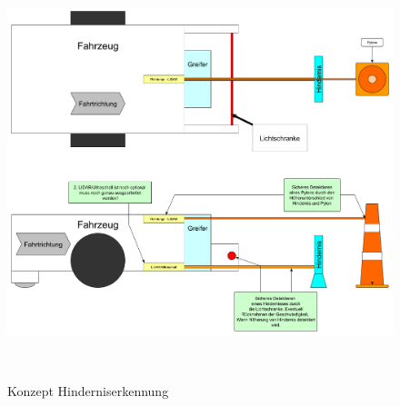 \documentclass[main.tex]{subfiles} %
\begin{document}
\begin{figure}[h!]
    \centering
    \includegraphics[width=0.75\linewidth]{./fig_Hinderniserkennung/Konzept_Hinderniserkennung.pdf}
    \caption{Konzept Hinderniserkennung}~\label{fig:Hinderniserkennung}
\end{figure}
\end{document}

